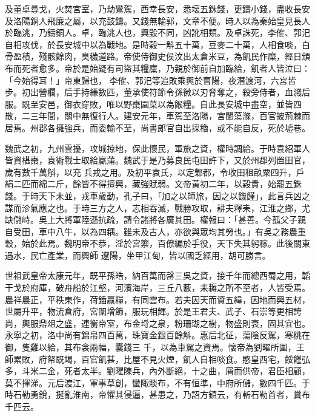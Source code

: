 \begin{pinyinscope}
 及董卓尋戈，火焚宮室，乃劫鸞駕，西幸長安，悉壞五銖錢，更鑄小錢，盡收長安及洛陽銅人飛廉之屬，以充鼓鑄。又錢無輪郭，文章不便。時人以為秦始皇見長人於臨洮，乃鑄銅人。卓，臨洮人也，興毀不同，凶訛相類。及卓誅死，李傕、郭汜自相攻伐，於長安城中以為戰地。是時穀一斛五十萬，豆麥二十萬，人相食啖，白骨盈積，殘骸餘肉，臭穢道路。帝使侍御史侯汶出太倉米豆，為飢民作糜，經日頒布而死者愈多。帝於是始疑有司盜其糧廩，乃親於御前自加臨給，飢者人皆泣曰：「今始得耳！」帝東歸也，
 李傕、郭汜等追敗乘輿於曹陽，夜潛渡河，六宮皆步。初出營欄，后手持縑數匹，董承使符節令孫徽以刃脅奪之，殺旁侍者，血濺后服。既至安邑，御衣穿敗，唯以野棗園菜以為餱糧。自此長安城中盡空，並皆四散，二三年間，關中無復行人。建安元年，車駕至洛陽，宮闈蕩滌，百官披荊棘而居焉。州郡各擁強兵，而委輸不至，尚書郎官自出採穭，或不能自反，死於墟巷。



 魏武之初，九州雲擾，攻城掠地，保此懷民，軍旅之資，權時調給。于時袁紹軍人皆資椹棗，袁術戰士取給蠃蒲。魏武于是乃募良民屯田許下，又於州郡列置田官，歲有數千萬斛，以充
 兵戎之用。及初平袁氏，以定鄴都，令收田租畝粟四升，戶絹二匹而綿二斤，餘皆不得擅興，藏強賦弱。文帝黃初二年，以穀貴，始罷五銖錢。于時天下未並，戎車歲動，孔子曰，「加之以師旅，因之以饑饉」，此言兵凶之謀而沴氣應之也。于時三方之人，志相吞滅，戰勝攻取，耕夫釋耒，江淮之鄉，尤缺儲峙。吳上大將軍陸遜抗疏，請令諸將各廣其田。權報曰：「甚善。今孤父子親自受田，車中八牛，以為四耦。雖未及古人，亦欲與眾均其勞也。」有吳之務農重穀，始於此焉。魏明帝不恭，淫於宮籞，百僚編於手役，天下失其躬稼。此後關東遇水，民亡產業，而興師
 遼陽，坐甲江甸，皆以國乏經用，胡可勝言。



 世祖武皇帝太康元年，既平孫皓，納百萬而罄三吳之資，接千年而總西蜀之用，韜干戈於府庫，破舟船於江壑，河濱海岸，三丘八藪，耒耨之所不至者，人皆受焉。農祥晨正，平秩東作，荷鍤贏糧，有同雲布。若夫因天而資五緯，因地而興五材，世屬升平，物流倉府，宮闈增飾，服玩相輝。於是王君夫、武子、石崇等更相誇尚，輿服鼎俎之盛，連衡帝室，布金埒之泉，粉珊瑚之樹，物盛則衰，固其宜也。永寧之初，洛中尚有錦帛四百萬，珠寶金銀百餘斛。惠后北征，蕩陰反駕，寒桃在御，隻雞以給，其布衾兩幅，囊錢三
 千，以為車駕之資焉。懷帝為劉曜所圍，王師累敗，府帑既竭，百官飢甚，比屋不見火煙，飢人自相啖食。愍皇西宅，餒饉弘多，斗米二金，死者太半。劉曜陳兵，內外斷絕，十之曲，屑而供帝，君臣相顧，莫不揮涕。元后渡江，軍事草創，蠻陬賧布，不有恒準，中府所儲，數四千匹。于時石勒勇銳，挻亂淮南，帝懼其侵逼，甚患之，乃詔方鎮云，有斬石勒首者，賞布千匹云。




\end{pinyinscope}
